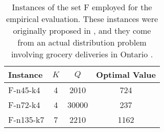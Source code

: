 \begin{table*}[ht]
	\centering
	\begin{tabular}[t]{lccc}
		\toprule
		\textbf{Instance} & $K$ & $Q$   & \textbf{Optimal Value} \\
		\midrule
		F-n45-k4          & 4   & 2010  & 724                    \\
		F-n72-k4          & 4   & 30000 & 237                    \\
		F-n135-k7         & 7   & 2210  & 1162                   \\
		\bottomrule
	\end{tabular}
	\label{tbl:cvrp-instance-family-F}
	\caption{Instances of the set F employed for the empirical evaluation.
		These instances were originally proposed in \textcite{fisher1994},
		and they come from an actual distribution problem involving grocery deliveries in Ontario \parencite{uchoa2017}.
	}
\end{table*}

